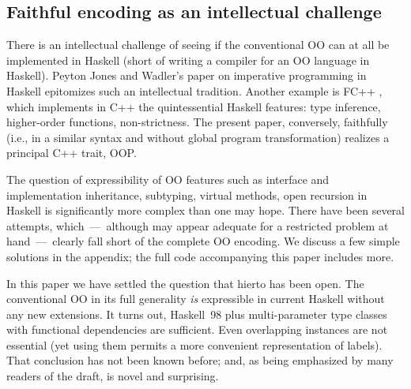 \begin{comment}
We will shed light on the subject matter. That is, we will
effectively use Haskell's type-class system to provide an OOP system
for Haskell. This system will be similar to OCaml's system, which we
view as a very strong existing marriage of functional programming and
OOP.
\end{comment}






\subsection{Faithful encoding as an intellectual challenge}

There is an intellectual challenge of seeing if the conventional OO
can at all be implemented in Haskell (short of writing a compiler for
an OO language in Haskell). Peyton Jones and Wadler's paper on
imperative programming in Haskell \cite{peytonjoneswadler-popl93}
epitomizes such an intellectual tradition. Another example is FC++
\cite{fcpp-jfp}, which implements in C++ the quintessential Haskell
features: type inference, higher-order functions, non-strictness. The
present paper, conversely, faithfully (i.e., in a similar syntax and
without global program transformation) realizes a principal C++ trait,
OOP.

The question of expressibility \cite{Felleisen90} of OO features such
as interface and implementation inheritance, subtyping, virtual
methods, open recursion in Haskell is significantly more complex than
one may hope. There have been several attempts, which~---~although may
appear adequate for a restricted problem at hand~---~clearly fall
short of the complete OO encoding. We discuss a few simple solutions
in the appendix; the full code accompanying this paper includes more.

In this paper we have settled the question that hierto has been open.
The conventional OO in its full generality \emph{is} expressible in
current Haskell without any new extensions. It turns out, Haskell~98
plus multi-parameter type classes with functional dependencies are
sufficient. Even overlapping instances are not essential (yet using
them permits a more convenient representation of labels).  That
conclusion has not been known before; and, as being emphasized by many
readers of the draft, is novel and surprising.



